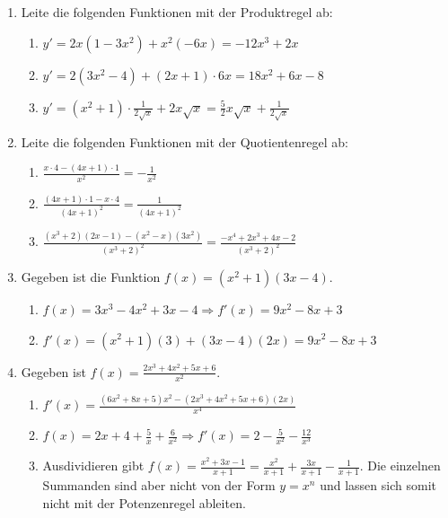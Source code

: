 \begin{enumerate}
	\item Leite die folgenden Funktionen mit der Produktregel ab:
	      \begin{enumerate}
		      \item \( y' = 2x(1 - 3x^2) + x^2(-6x) = -12x^3 +2x\)
		      \item \( y' = 2(3x^2-4)+(2x+1)\cdot 6x  = 18x^2 + 6x - 8 \)
		      \item \( y' = (x^2+1) \cdot \frac{1}{2\sqrt{x}} + 2x\sqrt{x} = \frac{5}{2} x\sqrt{x} +\frac{1}{2\sqrt{x}}\)
	      \end{enumerate}



	\item Leite die folgenden Funktionen mit der Quotientenregel ab:
	      \begin{enumerate}
		      \item $\frac{x\cdot 4 - (4x+1)\cdot 1}{x^2} = -\frac{1}{x^2}$
		      \item $\frac{(4x+1)\cdot 1 - x\cdot 4}{(4x+1)^2} = \frac{1}{(4x+1)^2}$
		      \item $\frac{(x^3+2)(2x-1) - (x^2-x)(3x^2)}{(x^3+2)^2} = \frac{-x^4+2x^3+4x-2}{(x^3+2)^2}$
	      \end{enumerate}

	\item Gegeben ist die Funktion \( f(x) = (x^2 + 1)(3x - 4) \).
	      \begin{enumerate}
		      \item $f(x) = 3x^3 - 4x^2 + 3x - 4 \Rightarrow f'(x) = 9x^2 - 8x + 3$
		      \item \( f'(x) = (x^2 + 1)(3) + (3x - 4)(2x) = 9x^2 - 8x + 3 \)
	      \end{enumerate}

	\item Gegeben ist \( f(x) = \frac{2x^3+4x^2+5x+6}{x^2} \).
	      \begin{enumerate}
		      \item \( f'(x) = \frac{(6x^2 + 8x + 5)x^2 - (2x^3 + 4x^2 + 5x + 6)(2x)}{x^4} \)
		      \item \( f(x) = 2x + 4 + \frac{5}{x} + \frac{6}{x^2} \Rightarrow f'(x) = 2 - \frac{5}{x^2} - \frac{12}{x^3} \)
		      \item Ausdividieren gibt $f(x) = \frac{x^2+3x-1}{x+1} = \frac{x^2}{x+1}+\frac{3x}{x+1}-\frac{1}{x+1}$. Die einzelnen Summanden sind aber nicht von der Form $y=x^n$ und lassen sich somit nicht mit der Potenzenregel ableiten.


\end{enumerate}
\end{enumerate}
